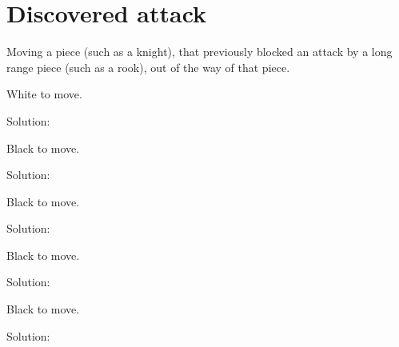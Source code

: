 \documentclass{book}
\begin{document}
\section{Discovered attack}
Moving a piece (such as a knight), that previously blocked an attack by a long range piece (such as a rook), out of the way of that piece.\begin{multicols}{2} 
\begin{samepage} 
\newgame 


 
\showboard
 
 White to move. 
 
Solution: 
 
\end{samepage}\begin{samepage} 
\newgame 


 
\showboard
 
 Black to move. 
 
Solution: 
 
\end{samepage}\begin{samepage} 
\newgame 


 
\showboard
 
 Black to move. 
 
Solution: 
 
\end{samepage}\begin{samepage} 
\newgame 


 
\showboard
 
 Black to move. 
 
Solution: 
 
\end{samepage}\begin{samepage} 
\newgame 


 
\showboard
 
 Black to move. 
 
Solution: 
 
\end{samepage}\end{multicols} 
\newpage 
\end{document}
